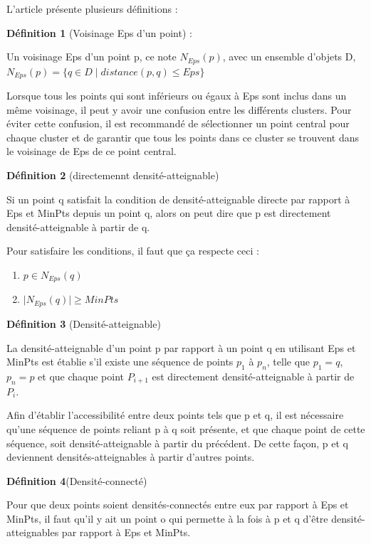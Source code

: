 \documentclass[
  oneside]{memoire-umons}
\begin{document}
L'article présente plusieurs définitions :

\textbf{Définition 1} (Voisinage Eps d'un point) :

Un voisinage Eps d'un point p, ce note \(N_{Eps}(p)\), avec un ensemble
d'objets D, \(N_{Eps}(p) = \{q \in D \mid distance(p,q) \leq Eps\}\)

Lorsque tous les points qui sont inférieurs ou égaux à Eps sont inclus
dans un même voisinage, il peut y avoir une confusion entre les
différents clusters. Pour éviter cette confusion, il est recommandé de
sélectionner un point central pour chaque cluster et de garantir que
tous les points dans ce cluster se trouvent dans le voisinage de Eps de
ce point central.

\textbf{Définition 2} (directemennt densité-atteignable)

Si un point q satisfait la condition de densité-atteignable directe par
rapport à Eps et MinPts depuis un point q, alors on peut dire que p est
directement densité-atteignable à partir de q.

Pour satisfaire les conditions, il faut que ça respecte ceci :

\begin{enumerate}
\def\labelenumi{\arabic{enumi}.}
\item
  \(p \in N_{Eps}(q)\)
\item
  \(\mid N_{Eps}(q)\mid \geq MinPts\)
\end{enumerate}

\textbf{Définition 3} (Densité-atteignable)

La densité-atteignable d'un point p par rapport à un point q en
utilisant Eps et MinPts est établie s'il existe une séquence de points
\(p_{1}\) à \(p_{n}\), telle que \(p_{1} = q\), \(p_{n} = p\) et que
chaque point \(P_{i+1}\) est directement densité-atteignable à partir de
\(P_{i}\).

Afin d'établir l'accessibilité entre deux points tels que p et q, il est
nécessaire qu'une séquence de points reliant p à q soit présente, et que
chaque point de cette séquence, soit densité-atteignable à partir du
précédent. De cette façon, p et q deviennent densités-atteignables à
partir d'autres points.

\textbf{Définition 4}(Densité-connecté)

Pour que deux points soient densités-connectés entre eux par rapport à
Eps et MinPts, il faut qu'il y ait un point o qui permette à la fois à p
et q d'être densité-atteignables par rapport à Eps et MinPts.
\end{document}
